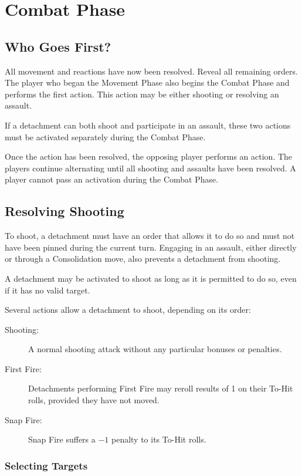 \section{Combat Phase}
\subsection{Who Goes First?}

All movement and reactions have now been resolved. Reveal all remaining orders. The player who began the Movement Phase also begins the Combat Phase and performs the first action. This action may be either shooting or resolving an assault.

If a detachment can both shoot and participate in an assault, these two actions must be activated separately during the Combat Phase.

Once the action has been resolved, the opposing player performs an action. The players continue alternating until all shooting and assaults have been resolved. A player cannot pass an activation during the Combat Phase.

\subsection{Resolving Shooting}

To shoot, a detachment must have an order that allows it to do so and must not have been pinned during the current turn. Engaging in an assault, either directly or through a Consolidation move, also prevents a detachment from shooting.

A detachment may be activated to shoot as long as it is permitted to do so, even if it has no valid target.

Several actions allow a detachment to shoot, depending on its order:

\begin{description}
    \item[Shooting:] A normal shooting attack without any particular bonuses or penalties.

    \item[First Fire:] Detachments performing First Fire may reroll results of 1 on their To-Hit rolls, provided they have not moved.

    \item[Snap Fire:] Snap Fire suffers a $-1$ penalty to its To-Hit rolls.
\end{description}

\subsubsection{Selecting Targets}

